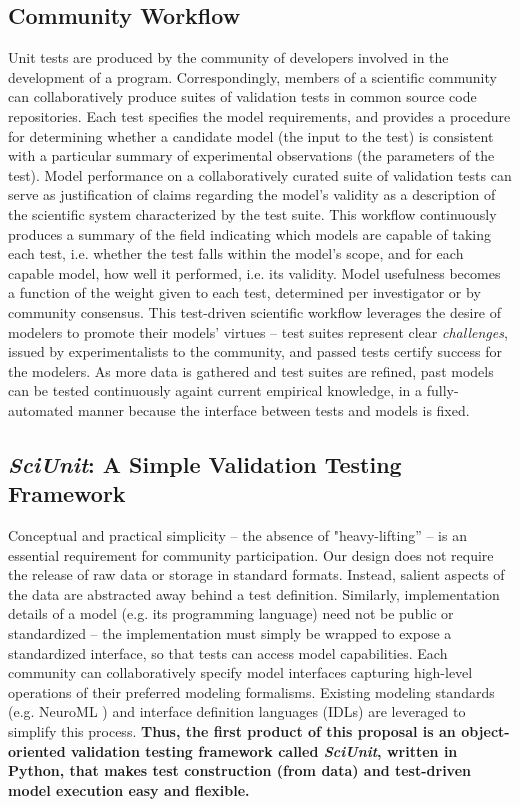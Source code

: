 \documentclass[11pt,letterpaper]{article}
\begin{document}
\subsection{Community Workflow}
Unit tests are produced by the community of developers involved in the development of a program. Correspondingly, members of a scientific community can collaboratively produce suites of validation tests in common source code repositories. Each test specifies the model requirements, and provides a procedure for determining whether a candidate model (the input to the test) is consistent with a particular summary of experimental observations (the parameters of the test). Model performance on a collaboratively curated suite of validation tests can serve as justification of claims regarding the model's validity as a description of the scientific system characterized by the test suite.
This workflow continuously produces a summary of the field indicating which models are capable of taking each test, i.e. whether the test falls within the model's scope, and for each capable model, how well it performed, i.e. its validity.  Model usefulness becomes a function of the weight given to each test, determined per investigator or by community consensus. This test-driven scientific workflow leverages the desire of modelers to promote their models' virtues -- test suites represent clear \emph{challenges}, issued by experimentalists to the community, and passed tests certify success for the modelers. As more data is gathered and test suites are refined, past models can be tested continuously againt current empirical knowledge, in a fully-automated manner because the interface between tests and models is fixed.  

\subsection{\textit{SciUnit}: A Simple Validation Testing Framework}
Conceptual and practical simplicity -- the absence of "heavy-lifting'' -- is an essential requirement for community participation. Our design does not require the release of raw data or storage in standard formats. Instead, salient aspects of the data are abstracted away behind a test definition. Similarly, implementation details of a model (e.g. its programming language) need not be public or standardized -- the implementation must simply be wrapped to expose a standardized interface, so that tests can access model capabilities. Each community can collaboratively specify model interfaces capturing high-level operations of their preferred modeling formalisms. Existing modeling standards (e.g. NeuroML \cite{neuroml_url,gleeson_neuroml:_2010}) and interface definition languages (IDLs) \cite{bachmann2008} are leveraged to simplify this process. \textbf{Thus, the first product of this proposal is an object-oriented validation testing framework called \textit{SciUnit}, written in Python, that makes test construction (from data) and test-driven model execution easy and flexible.} 
\end{document}
